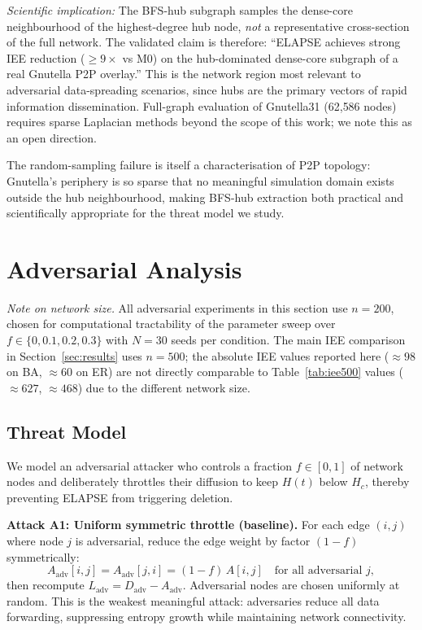 \documentclass[review,12pt]{elsarticle}
\newcommand{\Hc}{H_c}
\begin{document}
\emph{Scientific implication:} The BFS-hub subgraph samples the dense-core
neighbourhood of the highest-degree hub node, \emph{not} a representative
cross-section of the full network.  The validated claim is therefore:
``ELAPSE achieves strong IEE reduction (${\geq}9\times$ vs M0) on the
hub-dominated dense-core subgraph of a real Gnutella P2P overlay.''
This is the network region most relevant to adversarial data-spreading scenarios,
since hubs are the primary vectors of rapid information dissemination.
Full-graph evaluation of Gnutella31 (62{,}586 nodes) requires sparse Laplacian
methods beyond the scope of this work; we note this as an open direction.

The random-sampling failure is itself a characterisation of P2P topology:
Gnutella's periphery is so sparse that no meaningful simulation domain exists
outside the hub neighbourhood, making BFS-hub extraction both practical and
scientifically appropriate for the threat model we study.

\section{Adversarial Analysis}
\label{sec:adversarial}

\emph{Note on network size.}  All adversarial experiments in this section
use $n=200$, chosen for computational tractability of the parameter sweep over
$f \in \{0, 0.1, 0.2, 0.3\}$ with $N=30$ seeds per condition.
The main IEE comparison in Section~\ref{sec:results} uses $n=500$; the
absolute IEE values reported here (${\approx}98$ on BA, ${\approx}60$ on ER)
are not directly comparable to Table~\ref{tab:iee500} values (${\approx}627$,
${\approx}468$) due to the different network size.

\subsection{Threat Model}

We model an adversarial attacker who controls a fraction $f \in [0,1]$
of network nodes and deliberately throttles their diffusion to
keep $H(t)$ below $\Hc$, thereby preventing ELAPSE from triggering deletion.

\textbf{Attack A1: Uniform symmetric throttle (baseline).}
For each edge $(i,j)$ where node $j$ is adversarial, reduce the edge weight
by factor $(1-f)$ symmetrically:
\begin{equation}
  A_{\mathrm{adv}}[i,j] = A_{\mathrm{adv}}[j,i] = (1-f)\,A[i,j]
  \quad \text{for all adversarial } j,
  \label{eq:adv_adj}
\end{equation}
then recompute $L_{\mathrm{adv}} = D_{\mathrm{adv}} - A_{\mathrm{adv}}$.
Adversarial nodes are chosen uniformly at random. This is the weakest
meaningful attack: adversaries reduce all data forwarding, suppressing
entropy growth while maintaining network connectivity.
\end{document}

